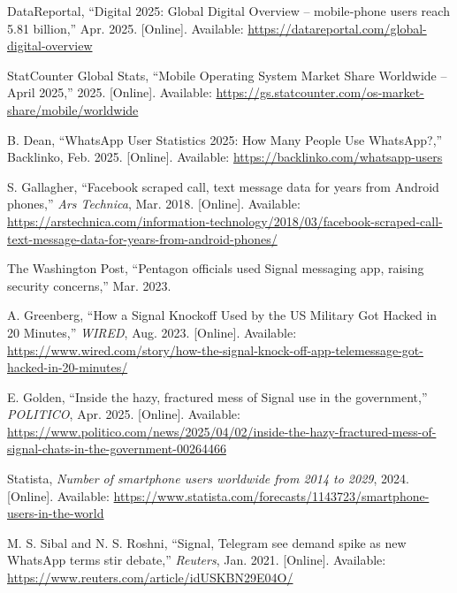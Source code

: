 \documentclass[a4paper,12pt]{report}
\begin{document}
\begin{thebibliography}{99}

DataReportal, “Digital 2025: Global Digital Overview – mobile‐phone users reach 5.81 billion,” Apr. 2025. [Online]. Available: \url{https://datareportal.com/global-digital-overview}

StatCounter Global Stats, “Mobile Operating System Market Share Worldwide – April 2025,” 2025. [Online]. Available: \url{https://gs.statcounter.com/os-market-share/mobile/worldwide}

B. Dean, “WhatsApp User Statistics 2025: How Many People Use WhatsApp?,” Backlinko, Feb. 2025. [Online]. Available: \url{https://backlinko.com/whatsapp-users}

S. Gallagher, “Facebook scraped call, text message data for years from Android phones,” \emph{Ars Technica}, Mar. 2018. [Online]. Available: \url{https://arstechnica.com/information-technology/2018/03/facebook-scraped-call-text-message-data-for-years-from-android-phones/}

The Washington Post, “Pentagon officials used Signal messaging app, raising security concerns,” Mar. 2023.

A. Greenberg, “How a Signal Knockoff Used by the US Military Got Hacked in 20 Minutes,” \emph{WIRED}, Aug. 2023. [Online]. Available: \url{https://www.wired.com/story/how-the-signal-knock-off-app-telemessage-got-hacked-in-20-minutes/}

E. Golden, “Inside the hazy, fractured mess of Signal use in the government,” \emph{POLITICO}, Apr. 2025. [Online]. Available: \url{https://www.politico.com/news/2025/04/02/inside-the-hazy-fractured-mess-of-signal-chats-in-the-government-00264466}

Statista, \emph{Number of smartphone users worldwide from 2014 to 2029}, 2024. [Online]. Available: \url{https://www.statista.com/forecasts/1143723/smartphone-users-in-the-world}

M. S. Sibal and N. S. Roshni, “Signal, Telegram see demand spike as new WhatsApp terms stir debate,” \emph{Reuters}, Jan. 2021. [Online]. Available: \url{https://www.reuters.com/article/idUSKBN29E04O/}


\end{thebibliography}
\end{document}
